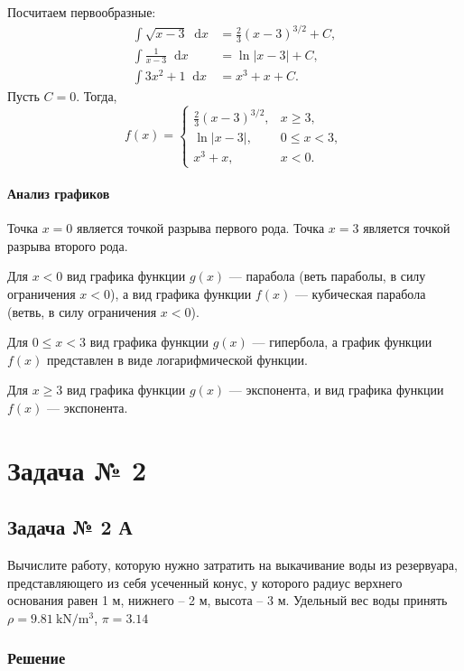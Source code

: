\documentclass[a4paper,12pt]{article}
\newcommand*\diff{\mathop{}\!\mathrm{d}}
\begin{document}
Посчитаем первообразные:
\begin{align*}
  \int \sqrt{x - 3} \diff x &= \frac{2}{3} {(x - 3)}^{3/2} + C, \\
  \int \frac{1}{x - 3} \diff x &= \ln|x - 3| + C, \\
  \int 3 x^2 + 1 \diff x &= x^3 + x + C.
\end{align*}
Пусть \(C = 0\).
Тогда,
\begin{equation}
  f(x) =
  \begin{cases}
    \frac{2}{3} {(x - 3)}^{3/2}, & x \ge 3, \\
    \ln|x - 3|, & 0 \le x < 3, \\
    x^3 + x, & x < 0.
  \end{cases}
\end{equation}

\paragraph{Анализ графиков}

Точка \(x = 0\) является точкой разрыва первого рода.
Точка \(x = 3\) является точкой разрыва второго рода.

Для \(x < 0\) вид графика функции \(g(x)\) --- парабола
(веть параболы, в силу ограничения \(x < 0\)),
а вид графика функции \(f(x)\) --- кубическая парабола
(ветвь, в силу ограничения \(x < 0\)).

Для \(0 \le x < 3\) вид графика функции \(g(x)\) --- гипербола,
а график функции \(f(x)\) представлен в виде логарифмической функции.

Для \(x \ge 3\) вид графика функции \(g(x)\) --- экспонента,
и вид графика функции \(f(x)\) --- экспонента.

\section{Задача № 2}

\subsection{Задача № 2 А}

Вычислите работу, которую нужно затратить на выкачивание воды из резервуара,
представляющего из себя усеченный конус,
у которого радиус верхнего основания равен 1 м, нижнего – 2 м, высота – 3 м.
Удельный вес воды принять \(\rho = \SI{9.81}{\kN\per\cubic\metre}\),
\(\pi = \num{3.14}\)

\subsubsection{Решение}
\end{document}
